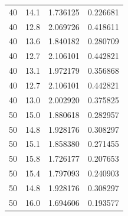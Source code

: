 \documentclass[11pt]{article}
\begin{document}
\begin{table}[H]
\begin{tabular}{c|c|c|c}
                    40 &           14.1 &          1.736125 &  0.226681 \\
                    40 &           12.8 &          2.069726 &  0.418611 \\
                    40 &           13.6 &          1.840182 &  0.280709 \\
                    40 &           12.7 &          2.106101 &  0.442821 \\
                    40 &           13.1 &          1.972179 &  0.356868 \\
                    40 &           12.7 &          2.106101 &  0.442821 \\
                    40 &           13.0 &          2.002920 &  0.375825 \\
                    50 &           15.0 &          1.880618 &  0.282957 \\
                    50 &           14.8 &          1.928176 &  0.308297 \\
                    50 &           15.1 &          1.858380 &  0.271455 \\
                    50 &           15.8 &          1.726177 &  0.207653 \\
                    50 &           15.4 &          1.797093 &  0.240903 \\
                    50 &           14.8 &          1.928176 &  0.308297 \\
                    50 &           16.0 &          1.694606 &  0.193577 \\
                \hline
                \end{tabular}
                \label{tab:data_1}
        \end{table}
\end{document}
